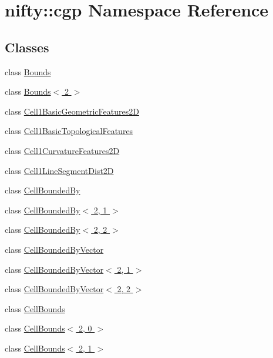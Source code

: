\hypertarget{namespacenifty_1_1cgp}{}\section{nifty\+:\+:cgp Namespace Reference}
\label{namespacenifty_1_1cgp}
\subsection*{Classes}
\begin{DoxyCompactItemize}
\item 
class \hyperlink{classnifty_1_1cgp_1_1Bounds}{Bounds}
\item 
class \hyperlink{classnifty_1_1cgp_1_1Bounds_3_012_01_4}{Bounds$<$ 2 $>$}
\item 
class \hyperlink{classnifty_1_1cgp_1_1Cell1BasicGeometricFeatures2D}{Cell1\+Basic\+Geometric\+Features2D}
\item 
class \hyperlink{classnifty_1_1cgp_1_1Cell1BasicTopologicalFeatures}{Cell1\+Basic\+Topological\+Features}
\item 
class \hyperlink{classnifty_1_1cgp_1_1Cell1CurvatureFeatures2D}{Cell1\+Curvature\+Features2D}
\item 
class \hyperlink{classnifty_1_1cgp_1_1Cell1LineSegmentDist2D}{Cell1\+Line\+Segment\+Dist2D}
\item 
class \hyperlink{classnifty_1_1cgp_1_1CellBoundedBy}{Cell\+Bounded\+By}
\item 
class \hyperlink{classnifty_1_1cgp_1_1CellBoundedBy_3_012_00_011_01_4}{Cell\+Bounded\+By$<$ 2, 1 $>$}
\item 
class \hyperlink{classnifty_1_1cgp_1_1CellBoundedBy_3_012_00_012_01_4}{Cell\+Bounded\+By$<$ 2, 2 $>$}
\item 
class \hyperlink{classnifty_1_1cgp_1_1CellBoundedByVector}{Cell\+Bounded\+By\+Vector}
\item 
class \hyperlink{classnifty_1_1cgp_1_1CellBoundedByVector_3_012_00_011_01_4}{Cell\+Bounded\+By\+Vector$<$ 2, 1 $>$}
\item 
class \hyperlink{classnifty_1_1cgp_1_1CellBoundedByVector_3_012_00_012_01_4}{Cell\+Bounded\+By\+Vector$<$ 2, 2 $>$}
\item 
class \hyperlink{classnifty_1_1cgp_1_1CellBounds}{Cell\+Bounds}
\item 
class \hyperlink{classnifty_1_1cgp_1_1CellBounds_3_012_00_010_01_4}{Cell\+Bounds$<$ 2, 0 $>$}
\item 
class \hyperlink{classnifty_1_1cgp_1_1CellBounds_3_012_00_011_01_4}{Cell\+Bounds$<$ 2, 1 $>$}

\end{DoxyCompactItemize}
